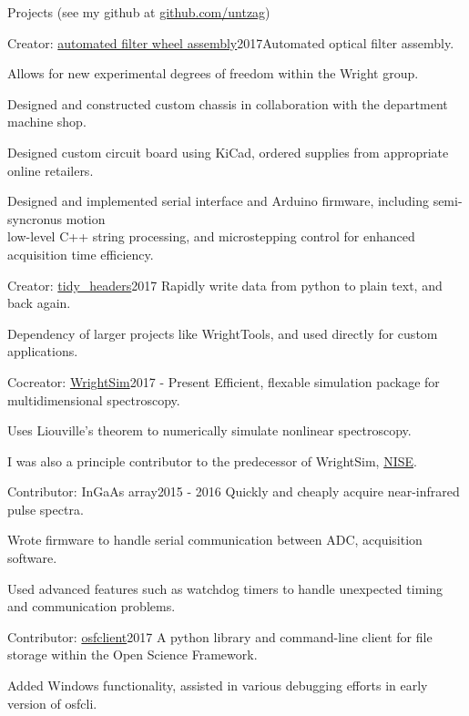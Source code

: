 \documentclass{resume}  %
\begin{document}
\begin{rSection}{Projects (\MakeLowercase{see my github at}
    \href{https://github.com/untzag}{\MakeLowercase{github.com/untzag}})}
\begin{rSubsection}{Creator: \href{https://github.com/wright-group/FilterWheels}{automated filter
        wheel assembly}}{2017}{Automated optical filter assembly.}{}
    \item Allows for new experimental degrees of freedom within the Wright group.
    \item Designed and constructed custom chassis in collaboration with the department machine shop.
    \item Designed custom circuit board using KiCad, ordered supplies from appropriate online
      retailers.
    \item Designed and implemented serial interface and Arduino firmware, including semi-syncronus
      motion \\ low-level C++ string processing, and microstepping control for enhanced acquisition
      time efficiency.
  \end{rSubsection}
  \begin{rSubsection}{Creator: \href{https://github.com/untzag/tidy_headers}{tidy\_headers}}{2017}
    {Rapidly write data from python to plain text, and back again.}{}
    \item Dependency of larger projects like WrightTools, and used directly for custom
      applications.
  \end{rSubsection}
  \begin{rSubsection}{Cocreator: \href{https://github.com/wright-group/WrightSim}{WrightSim}}{2017 -
      Present}
    {Efficient, flexable simulation package for multidimensional spectroscopy.}{}
    \item Uses Liouville's theorem to numerically simulate nonlinear spectroscopy.
    \item I was also a principle contributor to the predecessor of WrightSim,
      \href{https://github.com/wright-group/NISE}{NISE}.
  \end{rSubsection}
  \begin{rSubsection}{Contributor: InGaAs array}{2015 - 2016}
    {Quickly and cheaply acquire near-infrared pulse spectra.}{}
    \item Wrote firmware to handle serial communication between ADC, acquisition software.
    \item Used advanced features such as watchdog timers to handle unexpected timing and
      communication problems.
  \end{rSubsection}
  \begin{rSubsection}{Contributor: \href{https://github.com/dib-lab/osf-cli}{osfclient}}{2017}
    {A python library and command-line client for file storage within the Open Science Framework.}{}
    \item Added Windows functionality, assisted in various debugging efforts in early version of
      osfcli.
  \end{rSubsection}
\end{rSection}
\end{document}
